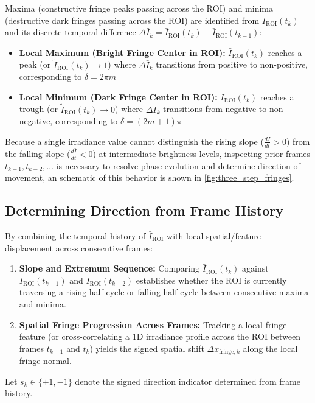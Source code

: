 Maxima (constructive fringe peaks passing across the $\text{ROI}$) and minima (destructive dark fringes passing across the $\text{ROI}$) are identified from $\bar{I}_{\text{ROI}}(t_k)$ and its discrete temporal difference $\Delta \bar{I}_k = \bar{I}_{\text{ROI}}(t_k) - \bar{I}_{\text{ROI}}(t_{k-1})$:
\begin{itemize}
    \item \textbf{Local Maximum (Bright Fringe Center in ROI):} $\bar{I}_{\text{ROI}}(t_k)$ reaches a peak (or $\tilde{I}_{\text{ROI}}(t_k) \to 1$) where $\Delta \bar{I}_k$ transitions from positive to non-positive, corresponding to $\delta = 2\pi m$
    \item \textbf{Local Minimum (Dark Fringe Center in ROI):} $\bar{I}_{\text{ROI}}(t_k)$ reaches a trough (or $\tilde{I}_{\text{ROI}}(t_k) \to 0$) where $\Delta \bar{I}_k$ transitions from negative to non-negative, corresponding to $\delta = (2m + 1) \pi$
\end{itemize}
Because a single irradiance value cannot distinguish the rising slope ($\frac{d\bar{I}}{dt} > 0$) from the falling slope ($\frac{d\bar{I}}{dt} < 0$) at intermediate brightness levels, inspecting prior frames $t_{k-1}, t_{k-2}, \dots$ is necessary to resolve phase evolution and determine direction of movement, an schematic of this behavior is shown in \cref{fig:three_step_fringes}.

\subsection{Determining Direction from Frame History}
By combining the temporal history of $\bar{I}_{\text{ROI}}$ with local spatial/feature displacement across consecutive frames:
\begin{enumerate}
    \item \textbf{Slope and Extremum Sequence:} Comparing $\bar{I}_{\text{ROI}}(t_k)$ against $\bar{I}_{\text{ROI}}(t_{k-1})$ and $\bar{I}_{\text{ROI}}(t_{k-2})$ establishes whether the $\text{ROI}$ is currently traversing a rising half-cycle or falling half-cycle between consecutive maxima and minima.
    \item \textbf{Spatial Fringe Progression Across Frames:} Tracking a local fringe feature (or cross-correlating a 1D irradiance profile across the $\text{ROI}$ between frames $t_{k-1}$ and $t_k$) yields the signed spatial shift $\Delta x_{\text{fringe}, k}$ along the local fringe normal.
\end{enumerate}
Let $s_k \in \{+1, -1\}$ denote the signed direction indicator determined from frame history.

